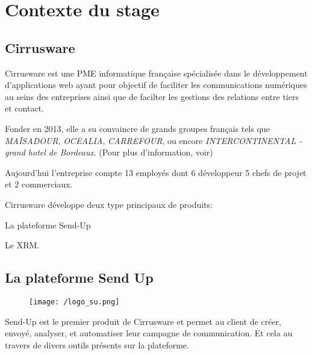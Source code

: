 \section{Contexte du stage}
\subsection{Cirrusware}
Cirrusware est une PME informatique française spécialisée dans le développement d'applications web ayant pour objectif de faciliter les communications numériques au seins des entreprises ainsi que de facilter les gestions des relations entre tiers et contact. 

Fonder en 2013, elle a su convaincre de grands groupes français tels que \textit{MAÏSADOUR}, \textit{OCEALIA}, \textit{CARREFOUR}, ou encore \textit{INTERCONTINENTAL - grand hotel de Bordeaux}. (Pour plus d'information, voir) 

Aujourd'hui l'entreprise compte 13 employés dont 6 développeur 5 chefs de projet et 2 commerciaux. 


Cirrusware développe deux type principaux de produits: 
\begin{list}{}{}
    \item La plateforme Send-Up\cite{sendup}
    \item Le XRM. 
\end{list}

\subsection{La plateforme Send Up}
\begin{figure}[!h]
\centering
    \texttt{[image: /logo\_su.png]}

\end{figure}
Send-Up est le premier produit de Cirrusware et permet au client de  créer, envoyé, analyser, et automatiser leur campagne de communication. Et cela au travers de divers outils présents sur la plateforme.


